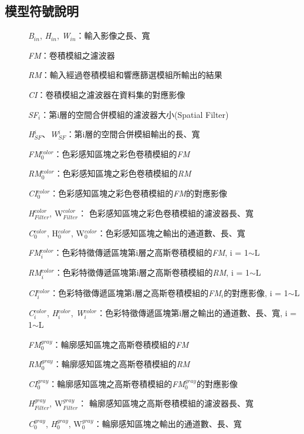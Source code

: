 \documentclass[class=NCU_thesis, crop=false]{standalone}
\begin{document}
\pagebreak

\subsection{模型符號說明}
	\begin{description}
		\item[]\textit{B}$_{in}$, \textit{H}$_{in}$, \textit{W}$_{in}$：輸入影像之長、寬

		\item[]\textit{FM}：卷積模組之濾波器
		\item[]\textit{RM}：輸入經過卷積模組和響應篩選模組所輸出的結果
		\item[]\textit{CI}：卷積模組之濾波器在資料集的對應影像
		\item[]\textit{SF}$_{i}$：第i層的空間合併模組的濾波器大小(Spatial Filter)
		\item[]\textit{H}$^{i}_{SF}$、\textit{W}$^{i}_{SF}$：第i層的空間合併模組輸出的長、寬

		\item[]\textit{FM}$^{color}_{0}$：色彩感知區塊之彩色卷積模組的\textit{FM}
		\item[]\textit{RM}$^{color}_{0}$：色彩感知區塊之彩色卷積模組的\textit{RM}
		\item[]\textit{CI}$^{color}_{0}$：色彩感知區塊之彩色卷積模組的\textit{FM}的對應影像
		\item[]\textit{H}$^{color}_{Filter}$, {W}$^{color}_{Filter}$： 色彩感知區塊之彩色卷積模組的濾波器長、寬
		\item[]\textit{C}$^{color}_{0}$, {H}$^{color}_{0}$, {W}$^{color}_{0}$：色彩感知區塊之輸出的通道數、長、寬

		\item[]\textit{FM}$^{color}_{i}$：色彩特徵傳遞區塊第i層之高斯卷積模組的\textit{FM}, i = 1$\sim$L
		\item[]\textit{RM}$^{color}_{i}$：色彩特徵傳遞區塊第i層之高斯卷積模組的\textit{RM}, i = 1$\sim$L
		\item[]\textit{CI}$^{color}_{i}$：色彩特徵傳遞區塊第i層之高斯卷積模組的\textit{FM}$_{i}$的對應影像, i = 1$\sim$L
		\item[]\textit{C}$^{color}_{i}$, \textit{H}$^{color}_{i}$, \textit{W}$^{color}_{i}$：色彩特徵傳遞區塊第i層之輸出的通道數、長、寬, i = 1$\sim$L
		
		\item[]\textit{FM}$^{gray}_{0}$：輪廓感知區塊之高斯卷積模組的\textit{FM}
		\item[]\textit{RM}$^{gray}_{0}$：輪廓感知區塊之高斯卷積模組的\textit{RM}
		\item[]\textit{CI}$^{gray}_{0}$：輪廓感知區塊之高斯卷積模組的\textit{FM}$^{gray}_{0}$的對應影像
		\item[]\textit{H}$^{gray}_{Filter}$, {W}$^{gray}_{Filter}$： 輪廓感知區塊之高斯卷積模組的濾波器長、寬
		\item[]\textit{C}$^{gray}_{0}$, \textit{H}$^{gray}_{0}$, {W}$^{gray}_{0}$：輪廓感知區塊之輸出的通道數、長、寬


\end{description}
\end{document}
